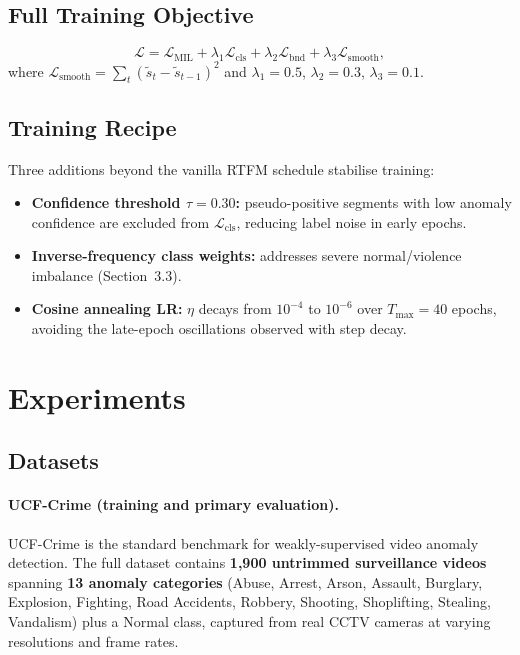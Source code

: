 \documentclass[11pt]{article}
\begin{document}
\subsection{Full Training Objective}

\begin{equation}
  \mathcal{L} = \mathcal{L}_\mathrm{MIL}
                + \lambda_1 \mathcal{L}_\mathrm{cls}
                + \lambda_2 \mathcal{L}_\mathrm{bnd}
                + \lambda_3 \mathcal{L}_\mathrm{smooth},
\end{equation}
where $\mathcal{L}_\mathrm{smooth}=\sum_t(\tilde{s}_t-\tilde{s}_{t-1})^2$
and $\lambda_1{=}0.5$, $\lambda_2{=}0.3$, $\lambda_3{=}0.1$.

\subsection{Training Recipe}

Three additions beyond the vanilla RTFM schedule stabilise training:
\begin{itemize}
  \item \textbf{Confidence threshold $\tau{=}0.30$:} pseudo-positive segments
        with low anomaly confidence are excluded from $\mathcal{L}_\mathrm{cls}$,
        reducing label noise in early epochs.
  \item \textbf{Inverse-frequency class weights:} addresses severe
        normal/violence imbalance (Section~3.3).
  \item \textbf{Cosine annealing LR:} $\eta$ decays from $10^{-4}$ to $10^{-6}$
        over $T_\mathrm{max}{=}40$ epochs, avoiding the late-epoch oscillations
        observed with step decay.
\end{itemize}


\section{Experiments}

\subsection{Datasets}

\paragraph{UCF-Crime (training and primary evaluation).}
UCF-Crime \citep{sultani2018real} is the standard benchmark for
weakly-supervised video anomaly detection.
The full dataset contains \textbf{1,900 untrimmed surveillance videos}
spanning \textbf{13 anomaly categories} (Abuse, Arrest, Arson, Assault,
Burglary, Explosion, Fighting, Road Accidents, Robbery, Shooting,
Shoplifting, Stealing, Vandalism) plus a Normal class,
captured from real CCTV cameras at varying resolutions and frame rates.
\end{document}
